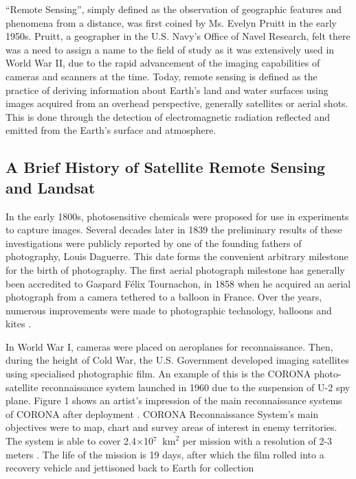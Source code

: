 
``Remote Sensing'', simply defined as the observation of geographic features and phenomena from a distance, was first coined by Ms. Evelyn Pruitt in the early 1950s. Pruitt, a geographer in the U.S. Navy's Office of Navel Research, felt there was a need to assign a name to the field of study as it was extensively used in World War II, due to the rapid advancement of the imaging capabilities of cameras and scanners at the time. Today, remote sensing is defined as the practice of deriving information about Earth's land and water surfaces using images acquired from an overhead perspective, generally satellites or aerial shots. This is done through the detection of electromagnetic radiation reflected and emitted from the Earth's surface and atmosphere. \cite{campbell2011introduction} 


\subsection{A Brief History of Satellite Remote Sensing and Landsat}
In the early 1800s, photosensitive chemicals were proposed for use in experiments to capture images. Several decades later in 1839 the preliminary results of these investigations were publicly reported by one of the founding fathers of photography, Louis Daguerre. This date forms the convenient arbitrary milestone for the birth of photography. The first aerial photograph milestone has generally been accredited to Gaspard F\'elix Tournachon, in 1858 when he acquired an aerial photograph from a camera tethered to a balloon in France. Over the years, numerous improvements were made to photographic technology, balloons and kites \cite{campbell2011introduction}. 
\par
In World War I, cameras were placed on aeroplanes for reconnaissance. Then, during the height of Cold War, the U.S. Government developed imaging satellites using specialised photographic film. An example of this is the CORONA photo-satellite reconnaissance system launched in 1960 due to the suspension of U-2 spy plane. Figure 1 shows an artist's impression of  the main reconnaissance systems of CORONA after deployment \cite{CORONA}. CORONA Reconnaissance System's main objectives were to map, chart and survey areas of interest in enemy territories. The system is able to cover
2.4$\times$10$^{7}$ $\mathrm{~km}^{2}$ per mission with a resolution of 2-3 meters \cite{CORONA}. The life of the mission is 19 days, after which the film rolled into a recovery vehicle and jettisoned back to Earth for collection


